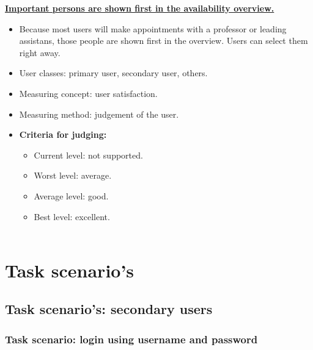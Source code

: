 \documentclass[11pt, a4paper,svglistings]{report}
\begin{document}
\textbf{\underline{Important persons are shown first in the availability overview.}}
\begin{itemize}
\item{Because most users will make appointments with a professor or leading assistans, those people are shown first in the overview. Users can select them right away.}
\item{User classes: primary user, secondary user, others.}
\item{Measuring concept: user satisfaction.}
\item{Measuring method: judgement of the user.}
\item{\textbf{Criteria for judging:}}
\begin{itemize}
\item{Current level: not supported.}
\item{Worst level: average.}
\item{Average level: good.}
\item{Best level: excellent. \\ \\}
\end{itemize}
\end{itemize}



\chapter{Task scenario's}

\section{Task scenario's: secondary users}

\subsection{Task scenario: login using username and password}
\end{document}
